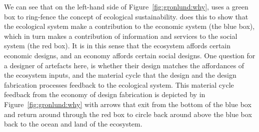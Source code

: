 We can see that on the left-hand side of Figure~\ref{fig:gronlund:why}, \citeauthor{gronlund_why_2019} uses a green box to ring-fence the concept of ecological sustainability. \citeauthor{gronlund_why_2019} does this to show that the ecological system make a contribution to the economic system (the blue box), which in turn makes a contribution of information and services to the social system (the red box). It is in this sense that the ecosystem affords certain economic designs, and an economy affords certain social designs. One question for a designer of artefacts here, is whether their design matches the affordances of the ecosystem inputs, and the material cycle that the design and the design fabrication processes feedback to the ecological system. This material cycle feedback from the economy of design fabrication is depicted by \citeauthor{gronlund_why_2019} in Figure~\ref{fig:gronlund:why} with arrows that exit from the bottom of the blue box and return around through the red box to circle back around above the blue box back to the ocean and land of the ecosystem. 










